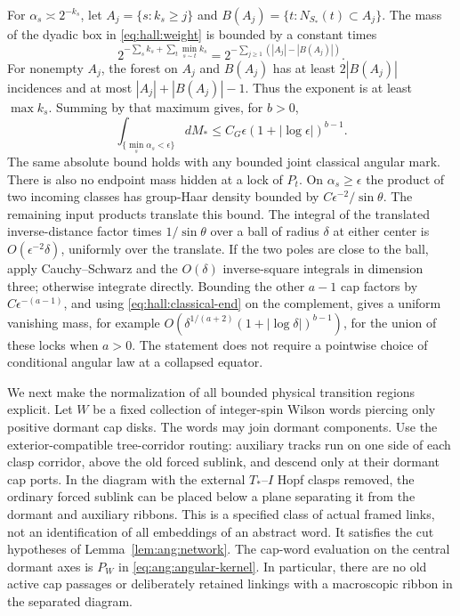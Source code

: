 For \(\alpha_s\asymp2^{-k_s}\), let \(A_j=\{s:k_s\ge j\}\) and
\(B(A_j)=\{t:N_{S_*}(t)\subset A_j\}\). The mass of the dyadic box in
\eqref{eq:hall:weight} is bounded by a constant times
\[
 2^{-\sum_s k_s+\sum_t\min_{s\sim t}k_s}
       =2^{-\sum_{j\ge1}(|A_j|-|B(A_j)|)} .
\]
For nonempty \(A_j\), the forest on \(A_j\) and \(B(A_j)\) has at least
\(2|B(A_j)|\) incidences and at most \(|A_j|+|B(A_j)|-1\).
Thus the exponent is at least \(\max k_s\). Summing by that maximum
gives, for \(b>0\),
\begin{equation}
 \int_{\{\min_s\alpha_s<\epsilon\}}dM_*
 \le C_G\epsilon(1+|\log\epsilon|)^{b-1}.
 \label{eq:hall:classical-end}
\end{equation}
The same absolute bound holds with any bounded joint classical angular
mark. There is also no endpoint mass hidden at a lock of \(P_t\).
On \(\alpha_s\ge\epsilon\) the product of two incoming classes has
group-Haar density bounded by \(C\epsilon^{-2}/\sin\theta\).
The remaining input products translate this bound. The integral of
the translated inverse-distance factor times \(1/\sin\theta\) over a
ball of radius \(\delta\) at either center is \(O(\epsilon^{-2}\delta)\),
uniformly over the translate. If the two poles are close to the ball,
apply Cauchy--Schwarz and the \(O(\delta)\) inverse-square integrals in
dimension three; otherwise integrate directly. Bounding the other
\(a-1\) cap factors by \(C\epsilon^{-(a-1)}\), and using
\eqref{eq:hall:classical-end} on the complement, gives a uniform
vanishing mass, for example
\(O(\delta^{1/(a+2)}(1+|\log\delta|)^{b-1})\), for the union of these
locks when \(a>0\). The statement does not require a pointwise choice
of conditional angular law at a collapsed equator.

We next make the normalization of all bounded physical transition
regions explicit. Let \(W\) be a fixed collection of integer-spin
Wilson words piercing only positive dormant cap disks. The words may
join dormant components. Use the exterior-compatible tree-corridor
routing: auxiliary tracks run on one side of each clasp corridor,
above the old forced sublink, and descend only at their dormant cap
ports. In the diagram with the external \(T_*\)--\(I\) Hopf clasps
removed, the ordinary forced sublink can be placed below a plane
separating it from the dormant and auxiliary ribbons. This is a
specified class of actual framed links, not an identification of all
embeddings of an abstract word. It satisfies the cut hypotheses of
Lemma~\ref{lem:ang:network}. The cap-word evaluation on the central
dormant axes is \(P_W\) in \eqref{eq:ang:angular-kernel}. In particular,
there are no old active cap passages or deliberately retained
linkings with a macroscopic ribbon in the separated diagram.

